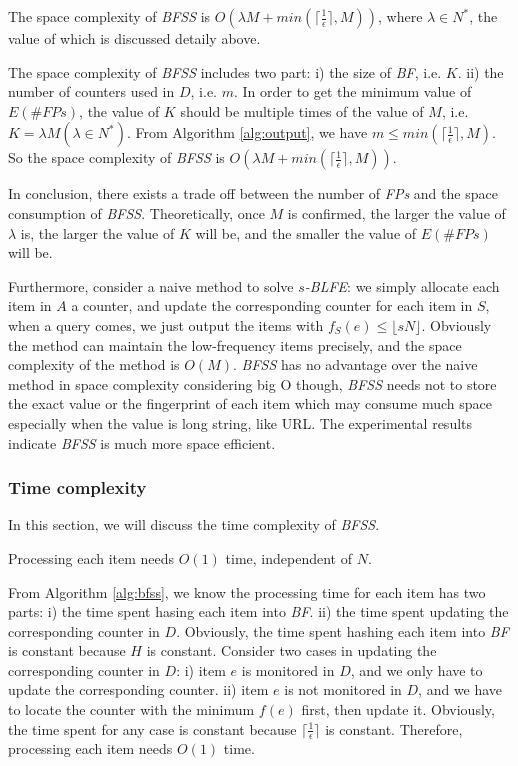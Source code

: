 \documentclass[conference]{IEEEtran}
\begin{document}
\begin{theorem}\label{thm:4}
The space complexity of \emph{BFSS} is $O(\lambda M+ min(\lceil\frac{1}{\epsilon}\rceil,M))$, where $\lambda\in N^*$, the value of which is discussed detaily above. 
\end{theorem}
\begin{IEEEproof}
The space complexity of \emph{BFSS} includes two part: i) the size of \emph{BF}, i.e. $K$. ii) the number of counters used in $D$, i.e. $m$. In order to get the minimum value of $E(\#FPs)$, the value of $K$ should be multiple times of the value of $M$, i.e. $K=\lambda M(\lambda\in N^*)$. From Algorithm \ref{alg:output}, we have $m\leq min(\lceil\frac{1}{\epsilon}\rceil,M)$. So the space complexity of \emph{BFSS} is $O(\lambda M+ min(\lceil\frac{1}{\epsilon}\rceil,M))$.
\end{IEEEproof}
In conclusion, there exists a trade off between the number of \emph{FPs} and the space consumption of \emph{BFSS}. Theoretically, once $M$ is confirmed, the larger the value of $\lambda$ is, the larger the value of $K$ will be, and the smaller the value of $E(\#FPs)$ will be.\par
Furthermore, consider a naive method to solve $s$\emph{-BLFE}: we simply allocate each item in $A$ a counter, and update the corresponding counter for each item in $S$, when a query comes, we just output the items with $f_S(e)\leq\lfloor sN\rfloor$. Obviously the method can maintain the low-frequency items precisely, and the space complexity of the method is $O(M)$. \emph{BFSS} has no advantage over the naive method in space complexity considering big O though, \emph{BFSS} needs not to store the exact value or the fingerprint of each item which may consume much space especially when the value is long string, like URL. The experimental results indicate \emph{BFSS} is much more space efficient.
\subsubsection{\textbf{Time complexity}}
In this section, we will discuss the time complexity of \emph{BFSS}.

\begin{theorem}\label{thm:5}
Processing each item needs $O(1)$ time, independent of $N$.
\end{theorem}

\begin{IEEEproof}
From Algorithm \ref{alg:bfss}, we know the processing time for each item has two parts: i) the time spent hasing each item into \emph{BF}. ii) the time spent updating the corresponding counter in $D$. Obviously, the time spent hashing each item into \emph{BF} is constant because $H$ is constant. Consider two cases in updating the corresponding counter in $D$: i) item $e$ is monitored in $D$, and we only have to update the corresponding counter. ii) item $e$ is not monitored in $D$, and we have to locate the counter with the minimum $f(e)$ first, then update it. Obviously, the time spent for any case is constant because $\lceil \frac{1}{\epsilon}\rceil$ is constant. Therefore, processing each item needs $O(1)$ time.
\end{IEEEproof}
\end{document}
